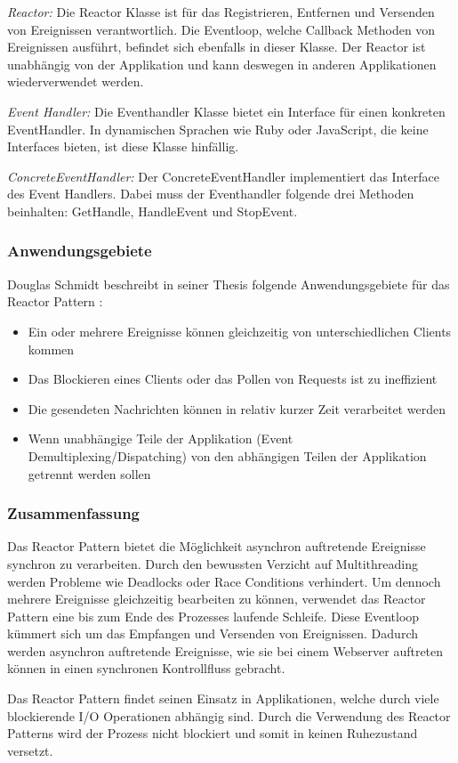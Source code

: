 \cite[p. 2]{Sch95}

\emph{Reactor:}
 Die Reactor Klasse ist für das Registrieren, Entfernen und Versenden von Ereignissen verantwortlich. Die Eventloop, welche Callback Methoden von Ereignissen ausführt, befindet sich ebenfalls in dieser Klasse. Der Reactor ist unabhängig von der Applikation und kann deswegen in anderen Applikationen wiederverwendet werden. 

\emph{Event Handler:}
Die Eventhandler Klasse bietet ein Interface für einen konkreten EventHandler. In dynamischen Sprachen wie Ruby oder JavaScript, die keine Interfaces bieten, ist diese Klasse hinfällig. 

\emph{ConcreteEventHandler:}
Der ConcreteEventHandler implementiert das Interface des Event Handlers. Dabei muss der Eventhandler folgende drei Methoden beinhalten: GetHandle, HandleEvent und StopEvent.

\subsubsection{Anwendungsgebiete}

Douglas Schmidt beschreibt in seiner Thesis folgende Anwendungsgebiete für das Reactor Pattern \cite[p. 4]{Sch95}:

\begin{itemize}
  \item Ein oder mehrere Ereignisse können gleichzeitig von unterschiedlichen Clients kommen
  \item Das Blockieren eines Clients oder das Pollen von Requests ist zu ineffizient
  \item Die gesendeten Nachrichten können in relativ kurzer Zeit verarbeitet werden
  \item Wenn unabhängige Teile der Applikation (Event Demultiplexing/Dispatching) von den abhängigen Teilen der Applikation getrennt werden sollen
\end{itemize}

\subsubsection{Zusammenfassung}

Das Reactor Pattern bietet die Möglichkeit asynchron auftretende Ereignisse synchron zu verarbeiten. Durch den bewussten Verzicht auf Multithreading werden Probleme wie Deadlocks oder Race Conditions verhindert. Um dennoch mehrere Ereignisse gleichzeitig bearbeiten zu können, verwendet das Reactor Pattern eine bis zum Ende des Prozesses laufende Schleife. Diese Eventloop kümmert sich um das Empfangen und Versenden von Ereignissen. Dadurch werden asynchron auftretende Ereignisse, wie sie bei einem Webserver auftreten können in einen synchronen Kontrollfluss gebracht. 

Das Reactor Pattern findet seinen Einsatz in Applikationen, welche durch viele blockierende I/O Operationen abhängig sind. Durch die Verwendung des Reactor Patterns wird der Prozess nicht blockiert und somit in keinen Ruhezustand versetzt.